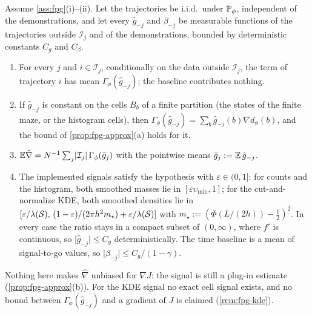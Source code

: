 \begin{proposition}\label{prop:env-crossfit}
Assume \cref{ass:fpg}(i)--(ii). Let the trajectories be i.i.d.\ under $\mathbb{P}_\phi$, independent of the demonstrations, and let every $\hat g_{-j}$ and $\beta_{-j}$ be measurable functions of the trajectories outside $\mathcal I_j$ and of the demonstrations, bounded by deterministic constants $C_g$ and $C_\beta$.
\begin{enumerate}[nosep,label=(\alph*)]
\item For every $j$ and $i\in\mathcal I_j$, conditionally on the data outside $\mathcal I_j$, the term of trajectory $i$ has mean $\Gamma_\phi(\hat g_{-j})$; the baseline contributes nothing.
\item If $\hat g_{-j}$ is constant on the cells $B_b$ of a finite partition (the states of the finite maze, or the histogram cells), then $\Gamma_\phi(\hat g_{-j})=\sum_b\hat g_{-j}(b)\nabla d_\phi(b)$, and the bound of \cref{prop:fpg-approx}(a) holds for it.
\item $\mathbb{E}\hat\nabla=N^{-1}\sum_j\lvert\mathcal I_j\rvert\,\Gamma_\phi(\bar g_j)$ with the pointwise means $\bar g_j:=\mathbb{E}\,\hat g_{-j}$.
\item The implemented signals satisfy the hypothesis with $\varepsilon\in(0,1]$: for counts and the histogram, both smoothed masses lie in $[\varepsilon\upsilon_{\min},1]$; for the cut-and-normalize KDE, both smoothed densities lie in $[\varepsilon/\lambda(\mathcal{S}),\,(1-\varepsilon)/(2\pi h^2m_\star)+\varepsilon/\lambda(\mathcal{S})]$ with $m_\star:=(\Phi(L/(2h))-\frac12)^2$. In every case the ratio stays in a compact subset of $(0,\infty)$, where $f'$ is continuous, so $\lvert\hat g_{-j}\rvert\le C_g$ deterministically. The time baseline is a mean of signal-to-go values, so $\lvert\beta_{-j}\rvert\le C_g/(1-\gamma)$.
\end{enumerate}
Nothing here makes $\hat\nabla$ unbiased for $\nabla J$: the signal is still a plug-in estimate (\cref{prop:fpg-approx}(b)). For the KDE signal no exact cell signal exists, and no bound between $\Gamma_\phi(\hat g_{-j})$ and a gradient of $J$ is claimed (\cref{rem:fpg-kde}).
\end{proposition}
